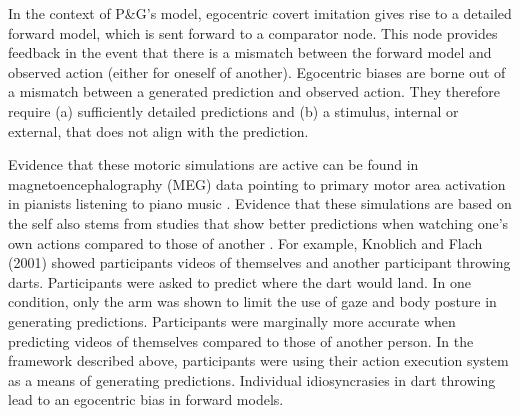             In the context of P\&G's model, egocentric covert imitation gives rise to a detailed forward model, which is sent forward to a comparator node. This node provides feedback in the event that there is a mismatch between the forward model and observed action (either for oneself of another). Egocentric biases are borne out of a mismatch between a generated prediction and observed action. They therefore require (a) sufficiently detailed predictions and (b) a stimulus, internal or external, that does not align with the prediction. \par
            Evidence that these motoric simulations are active can be found in magnetoencephalography (MEG) data pointing to primary motor area activation in pianists listening to piano music \cite{haueisen2001}. Evidence that these simulations are based on the self also stems from studies that show better predictions when watching one's own actions compared to those of another \cite{knoblich2001}. For example, Knoblich and Flach (2001) showed participants videos of themselves and another participant throwing darts. Participants were asked to predict where the dart would land. In one condition, only the arm was shown to limit the use of gaze and body posture in generating predictions. Participants were marginally more accurate when predicting videos of themselves compared to those of another person. In the framework described above, participants were using their action execution system as a means of generating predictions. Individual idiosyncrasies in dart throwing lead to an egocentric bias in forward models. \par
